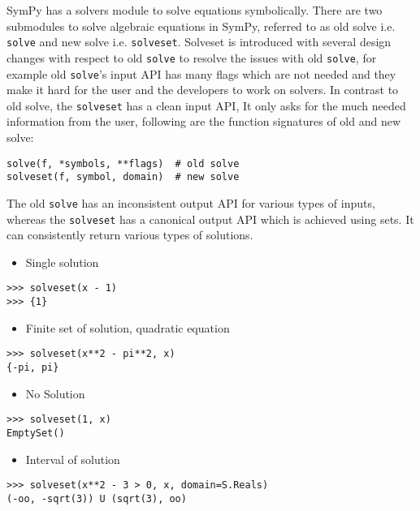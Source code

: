 

SymPy has a solvers module to solve equations symbolically. There are two
submodules to solve algebraic equations in SymPy, referred to as old solve
i.e. \texttt{solve} and new solve i.e. \texttt{solveset}. Solveset is
introduced with several design changes with respect to old \texttt{solve} to
resolve the issues with old \texttt{solve}, for example old \texttt{solve}'s
input API has many flags which are not needed and they make it hard for the
user and the developers to work on solvers. In contrast to old solve, the
\texttt{solveset} has a clean input API, It only asks for the much needed
information from the user, following are the function signatures of old and new
solve:

\begin{verbatim}
solve(f, *symbols, **flags)  # old solve
solveset(f, symbol, domain)  # new solve
\end{verbatim}

The old \texttt{solve} has an inconsistent output API for various types of
inputs, whereas the \texttt{solveset} has a canonical output API which is
achieved using sets. It can consistently return various types of solutions.

\begin{itemize}
\item Single solution
\end{itemize}
\begin{verbatim}
>>> solveset(x - 1)
>>> {1}
\end{verbatim}

\begin{itemize}
\item Finite set of solution, quadratic equation
\end{itemize}
\begin{verbatim}
>>> solveset(x**2 - pi**2, x)
{-pi, pi}
\end{verbatim}

\begin{itemize}
\item No Solution
\end{itemize}
\begin{verbatim}
>>> solveset(1, x)
EmptySet()
\end{verbatim}

\begin{itemize}
\item Interval of solution
\end{itemize}
\begin{verbatim}
>>> solveset(x**2 - 3 > 0, x, domain=S.Reals)
(-oo, -sqrt(3)) U (sqrt(3), oo)
\end{verbatim}

